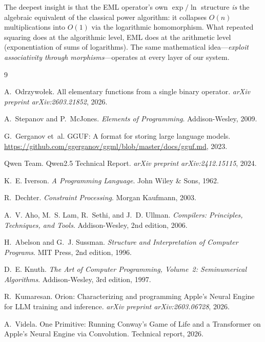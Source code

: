 \documentclass[acmsmall,nonacm]{acmart}
\begin{document}
The deepest insight is that the EML operator's own $\exp/\ln$ structure
\emph{is} the algebraic equivalent of the classical power algorithm: it
collapses $O(n)$ multiplications into $O(1)$ via the logarithmic
homomorphism.  What repeated squaring does at the algorithmic level,
EML does at the arithmetic level (exponentiation of sums of
logarithms).  The same mathematical idea---\emph{exploit associativity
through morphisms}---operates at every layer of our system.



\begin{thebibliography}{9}

A.~Odrzywołek.
\newblock All elementary functions from a single binary operator.
\newblock \emph{arXiv preprint arXiv:2603.21852}, 2026.

A.~Stepanov and P.~McJones.
\newblock \emph{Elements of Programming}.
\newblock Addison-Wesley, 2009.

G.~Gerganov et~al.
\newblock GGUF: A format for storing large language models.
\newblock \url{https://github.com/ggerganov/ggml/blob/master/docs/gguf.md}, 2023.

Qwen Team.
\newblock Qwen2.5 Technical Report.
\newblock \emph{arXiv preprint arXiv:2412.15115}, 2024.

K.~E. Iverson.
\newblock \emph{A Programming Language}.
\newblock John Wiley \& Sons, 1962.

R.~Dechter.
\newblock \emph{Constraint Processing}.
\newblock Morgan Kaufmann, 2003.

A.~V. Aho, M.~S. Lam, R.~Sethi, and J.~D. Ullman.
\newblock \emph{Compilers: Principles, Techniques, and Tools}.
\newblock Addison-Wesley, 2nd edition, 2006.

H.~Abelson and G.~J. Sussman.
\newblock \emph{Structure and Interpretation of Computer Programs}.
\newblock MIT Press, 2nd edition, 1996.

D.~E. Knuth.
\newblock \emph{The Art of Computer Programming, Volume~2:
  Seminumerical Algorithms}.
\newblock Addison-Wesley, 3rd edition, 1997.

R.~Kumaresan.
\newblock Orion: Characterizing and programming Apple's Neural Engine
  for LLM training and inference.
\newblock \emph{arXiv preprint arXiv:2603.06728}, 2026.

A.~Videla.
\newblock One Primitive: Running Conway's Game of Life and a
  Transformer on Apple's Neural Engine via Convolution.
\newblock Technical report, 2026.

\end{thebibliography}
\end{document}
